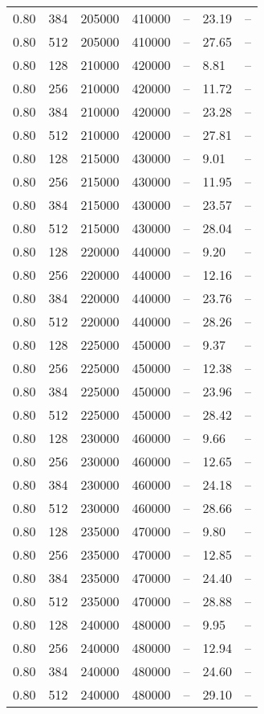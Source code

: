\begin{tabular}{l|l|l|l|l|l|l}
0.80 & 384 & 205000 & 410000 & -- & 23.19 & --\\
0.80 & 512 & 205000 & 410000 & -- & 27.65 & --\\
0.80 & 128 & 210000 & 420000 & -- &  8.81 & --\\
0.80 & 256 & 210000 & 420000 & -- & 11.72 & --\\
0.80 & 384 & 210000 & 420000 & -- & 23.28 & --\\
0.80 & 512 & 210000 & 420000 & -- & 27.81 & --\\
0.80 & 128 & 215000 & 430000 & -- &  9.01 & --\\
0.80 & 256 & 215000 & 430000 & -- & 11.95 & --\\
0.80 & 384 & 215000 & 430000 & -- & 23.57 & --\\
0.80 & 512 & 215000 & 430000 & -- & 28.04 & --\\
0.80 & 128 & 220000 & 440000 & -- &  9.20 & --\\
0.80 & 256 & 220000 & 440000 & -- & 12.16 & --\\
0.80 & 384 & 220000 & 440000 & -- & 23.76 & --\\
0.80 & 512 & 220000 & 440000 & -- & 28.26 & --\\
0.80 & 128 & 225000 & 450000 & -- &  9.37 & --\\
0.80 & 256 & 225000 & 450000 & -- & 12.38 & --\\
0.80 & 384 & 225000 & 450000 & -- & 23.96 & --\\
0.80 & 512 & 225000 & 450000 & -- & 28.42 & --\\
0.80 & 128 & 230000 & 460000 & -- &  9.66 & --\\
0.80 & 256 & 230000 & 460000 & -- & 12.65 & --\\
0.80 & 384 & 230000 & 460000 & -- & 24.18 & --\\
0.80 & 512 & 230000 & 460000 & -- & 28.66 & --\\
0.80 & 128 & 235000 & 470000 & -- &  9.80 & --\\
0.80 & 256 & 235000 & 470000 & -- & 12.85 & --\\
0.80 & 384 & 235000 & 470000 & -- & 24.40 & --\\
0.80 & 512 & 235000 & 470000 & -- & 28.88 & --\\
0.80 & 128 & 240000 & 480000 & -- &  9.95 & --\\
0.80 & 256 & 240000 & 480000 & -- & 12.94 & --\\
0.80 & 384 & 240000 & 480000 & -- & 24.60 & --\\
0.80 & 512 & 240000 & 480000 & -- & 29.10 & --\\

\end{tabular}
